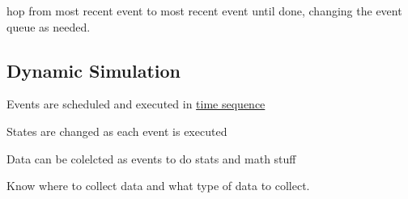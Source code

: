 \documentclass[fleqn]{report}
\begin{document}
hop from most recent event to most recent event until done, 
changing the event queue as needed. 

\subsection{Dynamic Simulation}
Events are scheduled and executed in \underline{time sequence}

States are changed as each event is executed 

Data can be colelcted as events to do stats and math stuff 

Know where to collect data and what type of data to collect. 

    

 
\end{document}
